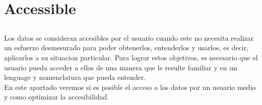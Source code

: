 \newpage
\section{Accessible}
\subsection*{}
 
Los datos se consideran accesibles por el usuario cuando este no necesita realizar un esfuerzo desmesurado para
poder obtenerlos, entenderlos y usarlos, es decir, aplicarlos a su situacion particular. Para lograr estos objetivos,
es necesario que el usuario pueda acceder a ellos de una manera que le resulte familiar y en un lenguage y nomenclatura
que pueda entender.\\ 

En este apartado veremos si es posible el acceso a los datos por un usuario medio y como optimizar la accesibilidad.









\begin{figure}[ht]
  \centering
  \end{figure}

    
